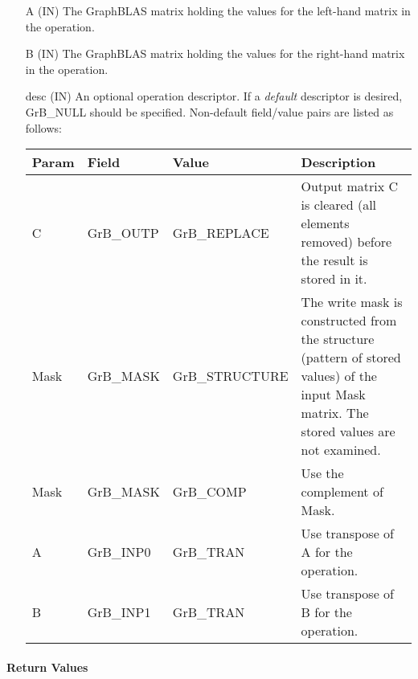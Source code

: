 \begin{itemize}[leftmargin=1.1in]
    \item[{\sf A}]    ({\sf IN}) The GraphBLAS matrix holding the values
    for the left-hand matrix in the operation.

    \item[{\sf B}]    ({\sf IN}) The GraphBLAS matrix holding the values for
    the right-hand matrix in the operation.

    \item[{\sf desc}] ({\sf IN}) An optional operation descriptor. If
    a \emph{default} descriptor is desired, {\sf GrB\_NULL} should be
    specified. Non-default field/value pairs are listed as follows:  \\

    \hspace*{-2em}\begin{tabular}{lllp{2.7in}}
        Param & Field  & Value & Description \\
        \hline
        {\sf C}    & {\sf GrB\_OUTP} & {\sf GrB\_REPLACE} & Output matrix {\sf C}
        is cleared (all elements removed) before the result is stored in it.\\

        {\sf Mask} & {\sf GrB\_MASK} & {\sf GrB\_STRUCTURE}   & The write mask is
        constructed from the structure (pattern of stored values) of the input
        {\sf Mask} matrix. The stored values are not examined.\\

        {\sf Mask} & {\sf GrB\_MASK} & {\sf GrB\_COMP}   & Use the 
        complement of {\sf Mask}. \\

        {\sf A}    & {\sf GrB\_INP0} & {\sf GrB\_TRAN}   & Use transpose of {\sf A}
        for the operation. \\

        {\sf B}    & {\sf GrB\_INP1} & {\sf GrB\_TRAN}   & Use transpose of {\sf B}
        for the operation. \\
    \end{tabular}
\end{itemize}

\paragraph{Return Values}

